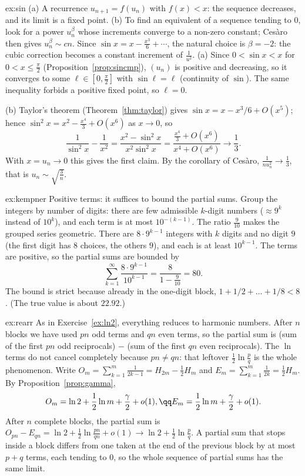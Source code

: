 \begin{solution}{ex:sin}
\idea (a) A recurrence $u_{n+1}=f(u_n)$ with $f(x)<x$: the sequence decreases, and its limit is a fixed point. (b) To find an equivalent of a sequence tending to $0$, look for a power $u_n^\beta$ whose increments converge to a non-zero constant; Ces\`aro then gives $u_n^\beta\sim cn$. Since $\sin x=x-\frac{x^3}6+\cdots$, the natural choice is $\beta=-2$: the cubic correction becomes a constant increment of $\frac1{u^2}$.
\writeup (a) Since $0<\sin x<x$ for $0<x\le\frac\pi2$ (Proposition~\ref{prop:sincmp}), $(u_n)$ is positive and decreasing, so it converges to some $\ell\in\left[0,\frac\pi2\right]$ with $\sin\ell=\ell$ (continuity of $\sin$). The same inequality forbids a positive fixed point, so $\ell=0$.

(b) Taylor's theorem (Theorem~\ref{thm:taylor}) gives $\sin x=x-x^3/6+O(x^5)$; hence $\sin^2x=x^2-\frac{x^4}3+O(x^6)$ as $x\to0$, so
\[
\frac1{\sin^2x}-\frac1{x^2}=\frac{x^2-\sin^2x}{x^2\sin^2x}=\frac{\frac{x^4}3+O(x^6)}{x^4+O(x^6)}\to\frac13.
\]
With $x=u_n\to0$ this gives the first claim. By the corollary of Ces\`aro, $\frac1{nu_n^2}\to\frac13$, that is $u_n\sim\sqrt{\frac3n}$.
\end{solution}

\begin{solution}{ex:kempner}
\idea Positive terms: it suffices to bound the partial sums. Group the integers by number of digits: there are few admissible $k$-digit numbers ($\approx9^k$ instead of $10^k$), and each term is at most $10^{-(k-1)}$. The ratio $\frac9{10}$ makes the grouped series geometric.
\writeup There are $8\cdot9^{k-1}$ integers with $k$ digits and no digit $9$ (the first digit has $8$ choices, the others $9$), and each is at least $10^{k-1}$.
The terms are positive, so the partial sums are bounded by
\[
\sum_{k=1}^\infty\frac{8\cdot9^{k-1}}{10^{k-1}}=\frac8{1-\frac9{10}}=80.
\]
The bound is strict because already in the one-digit block, $1+1/2+\dots+1/8<8$.
(The true value is about $22.92$.)
\end{solution}

\begin{solution}{ex:rearr}
\idea As in Exercise~\ref{ex:ln2}, everything reduces to harmonic numbers. After $n$ blocks we have used $pn$ odd terms and $qn$ even terms, so the partial sum is (sum of the first $pn$ odd reciprocals) $-$ (sum of the first $qn$ even reciprocals). The $\ln$ terms do not cancel completely because $pn\ne qn$: that leftover $\frac12\ln\frac pq$ is the whole phenomenon.
\writeup Write $O_m=\sum_{k=1}^m\frac1{2k-1}=H_{2m}-\frac12H_m$ and $E_m=\sum_{k=1}^m\frac1{2k}=\frac12H_m$. By Proposition~\ref{prop:gamma},
\[
\begin{gathered}O_m=\ln2+\frac12\ln m+\frac\gamma2+o(1),\qq E_m=\frac12\ln m+\frac\gamma2+o(1).\end{gathered}
\]
After $n$ complete blocks, the partial sum is
$O_{pn}-E_{qn}=\ln2+\frac12\ln\frac{pn}{qn}+o(1)\to\ln2+\frac12\ln\frac pq$.
A partial sum that stops inside a block differs from one taken at the end of the previous block by at most $p+q$ terms, each tending to $0$, so the whole sequence of
partial sums has the same limit.
\end{solution}


